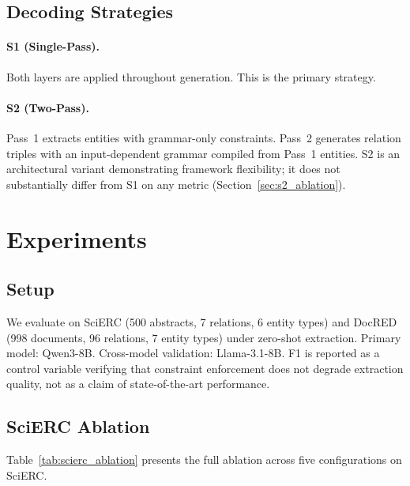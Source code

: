 \documentclass[11pt,a4paper]{article}
\begin{document}
\subsection{Decoding Strategies}

\paragraph{S1 (Single-Pass).} Both layers are applied throughout generation. This is the primary strategy.

\paragraph{S2 (Two-Pass).} Pass~1 extracts entities with grammar-only constraints. Pass~2 generates relation triples with an input-dependent grammar compiled from Pass~1 entities. S2 is an architectural variant demonstrating framework flexibility; it does not substantially differ from S1 on any metric (Section~\ref{sec:s2_ablation}).

\section{Experiments}
\label{sec:experiments}

\subsection{Setup}

We evaluate on SciERC (500 abstracts, 7 relations, 6 entity types) and DocRED (998 documents, 96 relations, 7 entity types) under zero-shot extraction. Primary model: Qwen3-8B. Cross-model validation: Llama-3.1-8B. F1 is reported as a control variable verifying that constraint enforcement does not degrade extraction quality, not as a claim of state-of-the-art performance.

\subsection{SciERC Ablation}
\label{sec:scierc_ablation}

Table~\ref{tab:scierc_ablation} presents the full ablation across five configurations on SciERC.
\end{document}
